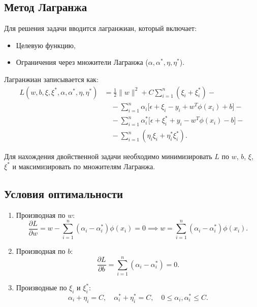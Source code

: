 \subsection{Метод Лагранжа}
\par Для решения задачи вводится лагранжиан, который включает:
\begin{itemize}
    \item Целевую функцию,
    \item Ограничения через множители Лагранжа (\(\alpha, \alpha^*, \eta, \eta^*\)).
\end{itemize}
\par Лагранжиан записывается как:
\begin{equation*}
\begin{aligned}
    L(w, b, \xi, \xi^*, \alpha, \alpha^*, \eta, \eta^*) &= \frac{1}{2} \|w\|^2 + C \sum_{i=1}^n (\xi_i + \xi_i^*) - \\
    &\quad - \sum_{i=1}^n \alpha_i \big[ \epsilon + \xi_i - y_i + w^T \phi(x_i) + b \big] - \\
    &\quad - \sum_{i=1}^n \alpha_i^* \big[ \epsilon + \xi_i^* + y_i - w^T \phi(x_i) - b \big] - \\
    &\quad - \sum_{i=1}^n (\eta_i \xi_i + \eta_i^* \xi_i^*).
\end{aligned}
\end{equation*}
\par Для нахождения двойственной задачи необходимо минимизировать \(L\) по \(w\), \(b\), \(\xi\), \(\xi^*\) и максимизировать по множителям Лагранжа.

\subsection{Условия оптимальности}
\begin{enumerate}
    \item Производная по \(w\):
    \begin{equation*}
        \frac{\partial L}{\partial w} = w - \sum_{i=1}^n (\alpha_i - \alpha_i^*) \phi(x_i) = 0 \implies 
        w = \sum_{i=1}^n (\alpha_i - \alpha_i^*) \phi(x_i).
    \end{equation*}
    \item Производная по \(b\):
    \begin{equation*}
        \frac{\partial L}{\partial b} = \sum_{i=1}^n (\alpha_i - \alpha_i^*) = 0.
    \end{equation*}
    \item Производные по \(\xi_i\) и \(\xi_i^*\):
    \begin{equation*}
        \alpha_i + \eta_i = C, \quad \alpha_i^* + \eta_i^* = C, \quad 0 \leq \alpha_i, \alpha_i^* \leq C.
    \end{equation*}
\end{enumerate}


